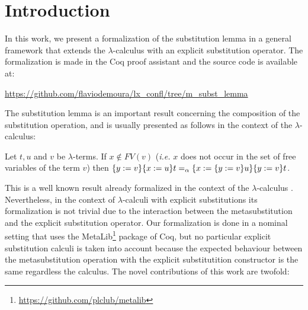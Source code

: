 \begin{coqdoccode}
\coqdocemptyline
\end{coqdoccode}
\section{Introduction}



 In this work, we present a formalization of the substitution lemma \cite{barendregtLambdaCalculusIts1984} in a general framework that extends the $\lambda$-calculus with an explicit substitution operator. The formalization is made in the Coq proof assistant \cite{teamCoqProofAssistant2021} and the source code is available at: \vspace{0.25cm}


 \url{https://github.com/flaviodemoura/lx_confl/tree/m_subst_lemma} \vspace{0.25cm}


The substitution lemma is an important result concerning the composition of the substitution operation, and is usually presented as follows in the context of the $\lambda$-calculus:


\begin{tcolorbox}
 Let $t,u$ and $v$ be $\lambda$-terms. If $x\notin FV(v)$ ({\it i.e.} $x$ does not occur in the set of free variables of the term $v$) then $\metasub{\metasub{t}{x}{u}}{y}{v} =_\alpha \metasub{\metasub{t}{y}{v}}{x}{\metasub{u}{y}{v}}$.
\end{tcolorbox}


This is a well known result already formalized in the context of the $\lambda$-calculus \cite{berghoferHeadtoHeadComparisonBruijn2007}. Nevertheless, in the context of $\lambda$-calculi with explicit substitutions its formalization is not trivial due to the interaction between the metasubstitution and the explicit substitution operator. Our formalization is done in a nominal setting that uses the MetaLib\footnote{\url{https://github.com/plclub/metalib}} package of Coq, but no particular explicit substitution calculi is taken into account because the expected behaviour between the metasubstitution operation with the explicit substitutition constructor is the same regardless the calculus. The novel contributions of this work are twofold:


